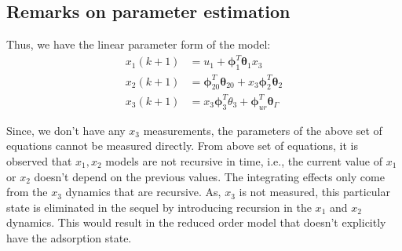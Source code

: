  \subsection{Remarks on parameter estimation}
 Thus, we have the linear parameter form of the model:
 \begin{align*}
     x_1(k+1) &= u_1 + \pmb \phi_1^T  \pmb \theta_1 x_3 \\
     x_2 (k+1) &= \pmb \phi_{20}^T \pmb \theta_{20} + x_3 \pmb \phi_2^T \pmb \theta_2\\
     x_3(k+1) &= x_3 \pmb \phi_3^T \theta_3 + \pmb \phi_{ur}^T \pmb \theta_\Gamma
 \end{align*}

 Since, we don't have any $x_3$ measurements, the parameters of the above set of equations cannot be measured directly. From above set of equations, it is observed that $x_1, x_2$ models are not recursive in time, i.e., the current value of $x_1$ or $x_2$ doesn't depend on the previous values. The integrating effects only come from the $x_3$ dynamics that are recursive. As, $x_3$ is not measured, this particular state is eliminated in the sequel by introducing recursion in the $x_1$ and $x_2$ dynamics. This would result in the reduced order model that doesn't explicitly have the adsorption state.
